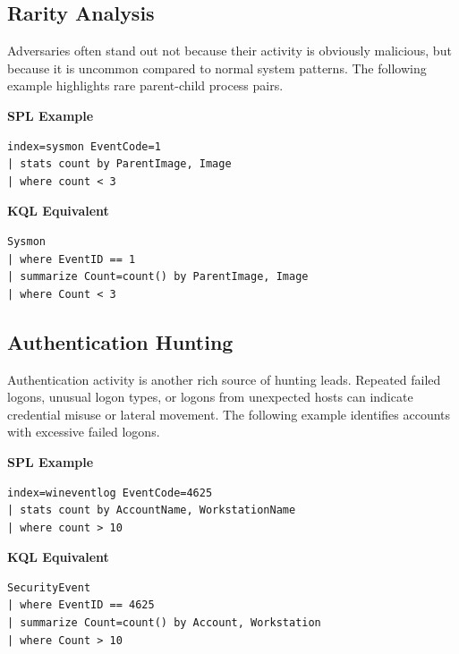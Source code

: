 \subsection*{Rarity Analysis}

Adversaries often stand out not because their activity is obviously malicious, but because it is uncommon compared 
to normal system patterns. The following example highlights rare parent-child process pairs.

\textbf{SPL Example}

\begin{lstlisting}
index=sysmon EventCode=1
| stats count by ParentImage, Image
| where count < 3
\end{lstlisting}

\textbf{KQL Equivalent}

\begin{lstlisting}
Sysmon
| where EventID == 1
| summarize Count=count() by ParentImage, Image
| where Count < 3
\end{lstlisting}


\subsection*{Authentication Hunting}

Authentication activity is another rich source of hunting leads. Repeated failed logons, unusual logon types, or 
logons from unexpected hosts can indicate credential misuse or lateral movement. The following example identifies 
accounts with excessive failed logons.

\textbf{SPL Example}

\begin{lstlisting}
index=wineventlog EventCode=4625
| stats count by AccountName, WorkstationName
| where count > 10
\end{lstlisting}

\textbf{KQL Equivalent}

\begin{lstlisting}
SecurityEvent
| where EventID == 4625
| summarize Count=count() by Account, Workstation
| where Count > 10
\end{lstlisting}


